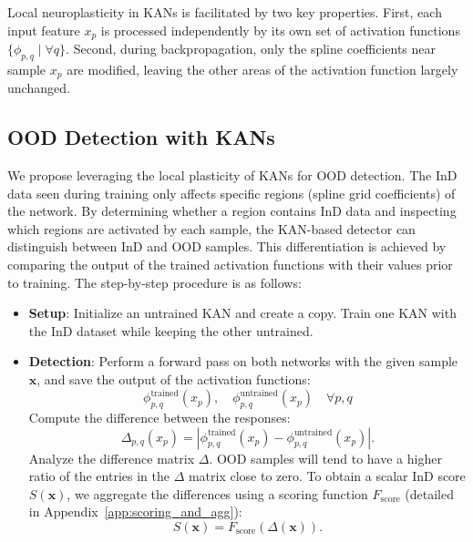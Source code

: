 Local neuroplasticity in KANs is facilitated by two key properties.
First, each input feature \( x_p \) is processed independently by its own set of activation functions \( \{\phi_{p, q} \mid \forall q \} \). 
Second, during backpropagation, only the spline coefficients near sample \( x_p \) are modified, leaving the other areas of the activation function largely unchanged.

\subsection{OOD Detection with KANs}
We propose leveraging the local plasticity of KANs for OOD detection. 
The InD data seen during training only affects specific regions (spline grid coefficients) of the network.
By determining whether a region contains InD data and inspecting which regions are activated by each sample, the KAN-based detector can distinguish between InD and OOD samples. 
This differentiation is achieved by comparing the output of the trained activation functions with their values prior to training.
The step-by-step procedure is as follows:

\begin{itemize}
    \item \textbf{Setup}: Initialize an untrained KAN and create a copy. Train one KAN with the InD dataset while keeping the other untrained.
    \item \textbf{Detection}: Perform a forward pass on both networks with the given sample $\textbf{x}$, and save the output of the activation functions:
    \begin{equation}
        \phi_{p, q}^{\text{trained}}(x_p), \quad \phi_{p, q}^{\text{untrained}}(x_p) \quad \forall p, q
    \end{equation}
    Compute the difference between the responses:
    \begin{equation}
        \Delta_{p, q}(x_p) = \left| \phi_{p, q}^{\text{trained}}(x_p) - \phi_{p, q}^{\text{untrained}}(x_p) \right|.
    \end{equation}
    Analyze the difference matrix \( \Delta \). OOD samples will tend to have a higher ratio of the entries in the \( \Delta \) matrix close to zero. 
    To obtain a scalar InD score $S(\textbf{x})$, we aggregate the differences using a scoring function \( F_{\text{score}} \) (detailed in Appendix~\ref{app:scoring_and_agg}):
    \begin{equation}
        S(\textbf{x}) = F_{\text{score}}(\Delta(\textbf{x})).
    \end{equation}
\end{itemize}

